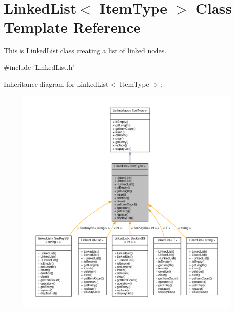 \hypertarget{classLinkedList}{}\section{Linked\+List$<$ Item\+Type $>$ Class Template Reference}
\label{classLinkedList}


This is \hyperlink{classLinkedList}{Linked\+List} class creating a list of linked nodes.  




{\ttfamily \#include \char`\"{}Linked\+List.\+h\char`\"{}}



Inheritance diagram for Linked\+List$<$ Item\+Type $>$\+:\nopagebreak
\begin{figure}[H]
\begin{center}
\leavevmode
\includegraphics[width=350pt]{classLinkedList__inherit__graph}
\end{center}
\end{figure}


